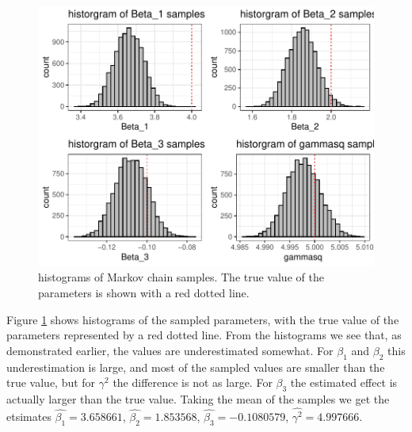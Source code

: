 \begin{figure}[H]
    \centering
    \includegraphics[width=\linewidth]{Images/ch3/MCMC_sample2_hist.pdf}
    \caption[MCMC1]{histograms of Markov chain samples. The true value of the parameters is shown with a red dotted line.}
    \label{fig:MCMC2_hist}
\end{figure}

Figure \ref{fig:MCMC2_hist} shows histograms of the sampled parameters, with the true value of the parameters represented by a red dotted line. From the histograms we see that, as demonstrated earlier, the values are underestimated somewhat. For $\beta_1$ and $\beta_2$ this underestimation is large, and most of the sampled values are smaller than the true value, but for $\gamma^2$ the difference is not as large. For $\beta_3$ the estimated effect is actually larger than the true value. Taking the mean of the samples we get the etsimates $\hat{\beta_1} = 3.658661$, $\hat{\beta_2} = 1.853568$, $\hat{\beta_3} = -0.1080579$, $\hat{\gamma^2} = 4.997666$.